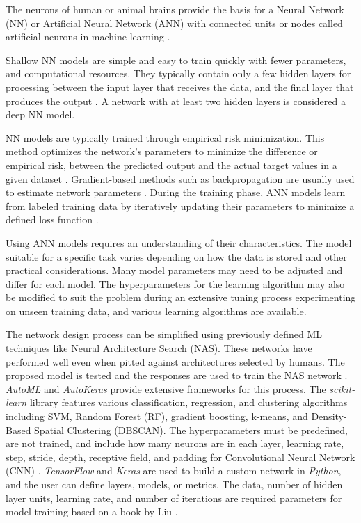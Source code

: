 \documentclass[sn-mathphys-num]{sn-jnl}%
\begin{document}
The neurons of human or animal brains provide the basis for a Neural Network (NN) or Artificial Neural Network (ANN) with connected units or nodes called artificial neurons in machine learning \cite{mitExplainedNeural, brahme2014comprehensive}. 

Shallow NN models are simple and easy to train quickly with fewer parameters, and computational resources. They typically contain only a few hidden layers for processing between the input layer that receives the data, and the final layer that produces the output \cite{olden2002illuminating, ozesmi1999artificial}.  A network with at least two hidden layers \cite{bishop2006pattern} is considered a deep NN model.

NN models are typically trained through empirical risk minimization. This method optimizes the network's parameters to minimize the difference or empirical risk, between the predicted output and the actual target values in a given dataset \cite{vapnik2013nature}. Gradient-based methods such as backpropagation are usually used to estimate network parameters  \cite{vapnik2013nature}. During the training phase, ANN models learn from labeled training data by iteratively updating their parameters to minimize a defined loss function \cite{goodfellow2016deep}.

Using ANN models requires an understanding of their characteristics. The model suitable for a specific task varies depending on how the data is stored and other practical considerations. Many model parameters may need to be adjusted and differ for each model. The hyperparameters for the learning algorithm may also be modified to suit the problem \cite{probst2019tunability} during an extensive tuning process experimenting on unseen training data, and various learning algorithms are available.

The network design process can be simplified using previously defined ML techniques like Neural Architecture Search (NAS). These networks have performed well even when pitted against architectures selected by humans. The proposed model is tested and the responses are used to train the NAS network \cite{zoph2016neural}. \textit{AutoML} and \textit{AutoKeras} \cite{jin2019auto} provide extensive frameworks for this process. The \textit{scikit-learn} library features various classification, regression, and clustering algorithms including SVM, Random Forest (RF), gradient boosting, k-means, and Density-Based Spatial Clustering (DBSCAN). The hyperparameters must be predefined, are not trained, and include how many neurons are in each layer, learning rate, step, stride, depth, receptive field, and padding for Convolutional Neural Network (CNN) \cite{claesen2015hyperparameter}. \textit{TensorFlow} and \textit{Keras} are used to build a custom network in \textit{Python}, and the user can define layers, models, or metrics. The data, number of hidden layer units, learning rate, and number of iterations are required parameters for model training based on a book by Liu \cite{liu2020python}.
\end{document}
